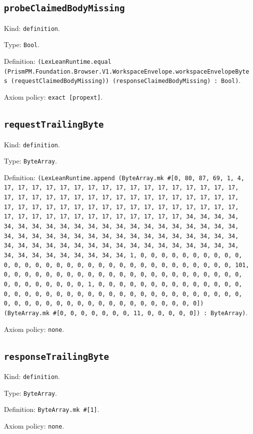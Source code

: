 \documentclass[11pt]{article}
\begin{document}
\subsection*{\texttt{probeClaimedBodyMissing}}
\noindent Kind: \texttt{definition}.\par
\noindent Type: \texttt{Bool}.\par
\noindent Definition: \texttt{(LexLeanRuntime.equal (PrismPM.Foundation.Browser.V1.WorkspaceEnvelope.workspaceEnvelopeBytes (requestClaimedBodyMissing)) (responseClaimedBodyMissing) : Bool)}.\par
\noindent Axiom policy: \texttt{exact [propext]}.\par
\subsection*{\texttt{requestTrailingByte}}
\noindent Kind: \texttt{definition}.\par
\noindent Type: \texttt{ByteArray}.\par
\noindent Definition: \texttt{(LexLeanRuntime.append (ByteArray.mk \#[0, 80, 87, 69, 1, 4, 17, 17, 17, 17, 17, 17, 17, 17, 17, 17, 17, 17, 17, 17, 17, 17, 17, 17, 17, 17, 17, 17, 17, 17, 17, 17, 17, 17, 17, 17, 17, 17, 17, 17, 17, 17, 17, 17, 17, 17, 17, 17, 17, 17, 17, 17, 17, 17, 17, 17, 17, 17, 17, 17, 17, 17, 17, 17, 17, 17, 17, 17, 17, 17, 34, 34, 34, 34, 34, 34, 34, 34, 34, 34, 34, 34, 34, 34, 34, 34, 34, 34, 34, 34, 34, 34, 34, 34, 34, 34, 34, 34, 34, 34, 34, 34, 34, 34, 34, 34, 34, 34, 34, 34, 34, 34, 34, 34, 34, 34, 34, 34, 34, 34, 34, 34, 34, 34, 34, 34, 34, 34, 34, 34, 34, 34, 34, 34, 1, 0, 0, 0, 0, 0, 0, 0, 0, 0, 0, 0, 0, 0, 0, 0, 0, 0, 0, 0, 0, 0, 0, 0, 0, 0, 0, 0, 0, 0, 0, 0, 0, 101, 0, 0, 0, 0, 0, 0, 0, 0, 0, 0, 0, 0, 0, 0, 0, 0, 0, 0, 0, 0, 0, 0, 0, 0, 0, 0, 0, 0, 0, 0, 0, 1, 0, 0, 0, 0, 0, 0, 0, 0, 0, 0, 0, 0, 0, 0, 0, 0, 0, 0, 0, 0, 0, 0, 0, 0, 0, 0, 0, 0, 0, 0, 0, 0, 0, 0, 0, 0, 0, 0, 0, 0, 0, 0, 0, 0, 0, 0, 0, 0, 0, 0, 0, 0, 0, 0, 0, 0]) (ByteArray.mk \#[0, 0, 0, 0, 0, 0, 0, 11, 0, 0, 0, 0, 0]) : ByteArray)}.\par
\noindent Axiom policy: \texttt{none}.\par
\subsection*{\texttt{responseTrailingByte}}
\noindent Kind: \texttt{definition}.\par
\noindent Type: \texttt{ByteArray}.\par
\noindent Definition: \texttt{ByteArray.mk \#[1]}.\par
\noindent Axiom policy: \texttt{none}.\par
\end{document}
